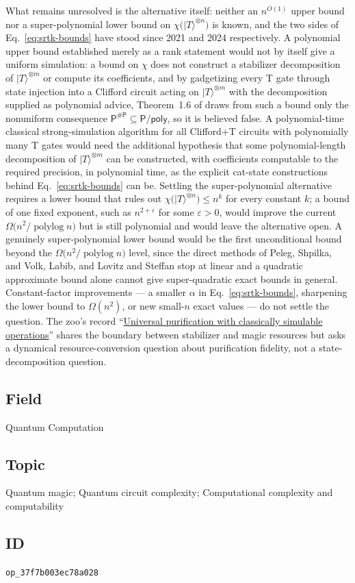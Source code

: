 What remains unresolved is the alternative itself: neither an $n^{O(1)}$
upper bound nor a super-polynomial lower bound on
$\chi\bigl(|T\rangle^{\otimes n}\bigr)$ is known, and the two sides of
Eq.~\eqref{eq:srtk-bounds} have stood since 2021 and 2024 respectively.
A polynomial upper bound established merely as a rank statement would
not by itself give a uniform simulation: a bound on $\chi$ does not
construct a stabilizer decomposition of $|T\rangle^{\otimes m}$ or compute
its coefficients, and by gadgetizing every T gate through state injection
into a Clifford circuit acting on $|T\rangle^{\otimes m}$ with the
decomposition supplied as polynomial advice, Theorem~1.6 of
 draws from such a bound only the
nonuniform consequence
$\mathsf{P}^{\#\mathsf{P}} \subseteq \mathsf{P}/\mathsf{poly}$, so it is
believed false.  A polynomial-time classical strong-simulation algorithm
for all Clifford+T circuits with polynomially many T gates would need the
additional hypothesis that some polynomial-length decomposition of
$|T\rangle^{\otimes m}$ can be constructed, with coefficients computable
to the required precision, in polynomial time, as the explicit cat-state
constructions behind Eq.~\eqref{eq:srtk-bounds} can be.  Settling the super-polynomial alternative requires a lower bound that
rules out $\chi\bigl(|T\rangle^{\otimes n}\bigr) \le n^{k}$ for every
constant $k$; a bound of one fixed exponent, such as $n^{2+\varepsilon}$
for some $\varepsilon > 0$, would improve the current
$\Omega\bigl(n^{2}/\operatorname{polylog} n\bigr)$ but is still polynomial
and would leave the alternative open.  A genuinely super-polynomial lower
bound would be the first unconditional bound beyond the
$\Omega\bigl(n^{2}/\operatorname{polylog} n\bigr)$ level, since the
direct methods of Peleg, Shpilka, and Volk, Labib, and Lovitz and Steffan
stop at linear and a quadratic approximate bound alone cannot give
super-quadratic exact bounds in general.  Constant-factor improvements ---
a smaller $\alpha$ in Eq.~\eqref{eq:srtk-bounds}, sharpening the lower
bound to $\Omega(n^{2})$, or new small-$n$ exact values --- do not settle
the question.  The zoo's record ``\href{https://qiqc-op.com/problem/op_a64dc63d6ae49127/}{Universal purification with classically simulable operations}'' shares the boundary between stabilizer and magic
resources but asks a dynamical resource-conversion question about
purification fidelity, not a state-decomposition question.

\subsection*{Field}

Quantum Computation

\subsection*{Topic}

Quantum magic; Quantum circuit complexity; Computational complexity and computability

\subsection*{ID}

\texttt{op\_37f7b003ec78a028}

